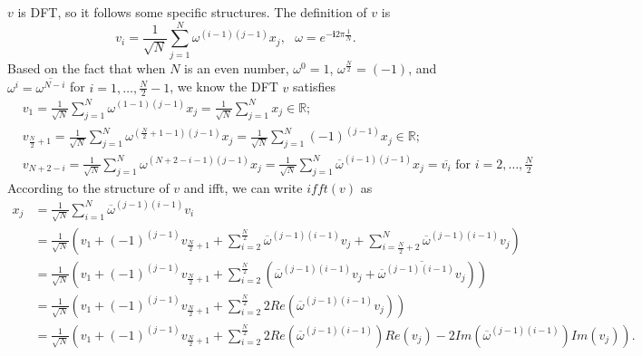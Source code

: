 \documentclass[final,onefignum,onetabnum]{siamart190516}
\begin{document}
$v$ is DFT, so it follows some specific structures. The definition of $v$ is
\begin{equation}
    v_{i} = \frac{1}{\sqrt{N}}\sum_{j = 1}^N \omega^{(i-1)(j-1)} x_j,\text{ }\omega = e^{-\mathbf{i}2\pi\frac{1}{N}}.
\end{equation}
Based on the fact that when $N$ is an even number, $\omega^0 = 1$, $\omega^{\frac{N}{2}} = (-1)$, and $\omega^{i} = \overline{\omega^{N-i}}$ for $i = 1,\dots,\frac{N}{2}-1$, we know the DFT $v$ satisfies
\begin{equation}
    \begin{aligned}
        &v_1 = \frac{1}{\sqrt{N}}\sum_{j = 1}^{N} \omega^{(1-1)(j-1)} x_j = \frac{1}{\sqrt{N}}\sum_{j=1}^{N} x_j\in \mathbb{R};\\
        &v_{\frac{N}{2}+1} = \frac{1}{\sqrt{N}}\sum_{j = 1}^{N} \omega^{(\frac{N}{2}+1-1)(j-1)} x_j = \frac{1}{\sqrt{N}}\sum_{j=1}^{N} (-1)^{(j-1)} x_j \in \mathbb{R};\\
        &v_{N+2-i} = \frac{1}{\sqrt{N}}\sum_{j = 1}^N \omega^{(N+2-i-1)(j-1)} x_j = \frac{1}{\sqrt{N}}\sum_{j=1}^N \overline{\omega}^{(i-1)(j-1)} x_j = \overline{v_i} \text{ for } i = 2,\dots, \frac{N}{2} 
    \end{aligned}
\end{equation}
According to the structure of $v$ and ifft, we can write $ifft(v)$ as
\begin{equation}
\begin{aligned}
    x_j &= \frac{1}{\sqrt{N}} \sum_{i=1}^N\overline{\omega}^{(j-1)(i-1)} v_i\\
    & = \frac{1}{\sqrt{N}} \left(v_1 + (-1)^{(j-1)}v_{\frac{N}{2}+1}
    + \sum_{i=2}^{\frac{N}{2}}\overline{\omega}^{(j-1)(i-1)}v_j + \sum_{i=\frac{N}{2}+2}^N \overline{\omega}^{(j-1)(i-1)}v_j\right)\\
    & = \frac{1}{\sqrt{N}}\left(v_1 + (-1)^{(j-1)}v_{\frac{N}{2}+1}
    + \sum_{i=2}^{\frac{N}{2}}\left(\overline{\omega}^{(j-1)(i-1)}v_j + \overline{\overline{\omega}^{(j-1)(i-1)}v_j}\right)\right)\\
    & = \frac{1}{\sqrt{N}} \left(v_1 + (-1)^{(j-1)}v_{\frac{N}{2}+1}
    + \sum_{i=2}^{\frac{N}{2}} 2Re\left(\overline{\omega}^{(j-1)(i-1)}v_j\right) \right)\\
    & = \frac{1}{\sqrt{N}} \left(v_1 + (-1)^{(j-1)}v_{\frac{N}{2}+1}
    + \sum_{i=2}^{\frac{N}{2}} 2Re\left(\overline{\omega}^{(j-1)(i-1)}\right)Re(v_j) - 2Im\left(\overline{\omega}^{(j-1)(i-1)}\right)Im(v_j)\right).
\end{aligned}
\end{equation}
\end{document}
